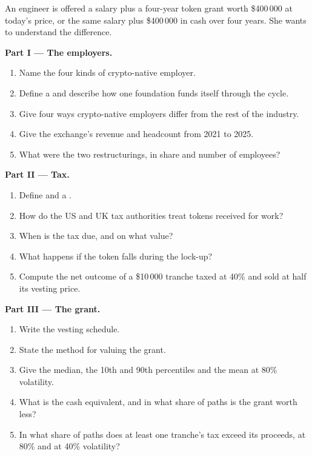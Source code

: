 \begin{problem}\label{pb:in:crypto-native-firms:1}
An engineer is offered a salary plus a four-year token grant worth \$400\,000 at today's price, or the same salary plus
\$400\,000 in cash over four years. She wants to understand the difference.

\medskip\noindent\textbf{Part I --- The employers.}
\begin{enumerate}
\item Name the four kinds of crypto-native employer.
\item Define a  and describe how one foundation funds itself through the cycle.
\item Give four ways crypto-native employers differ from the rest of the industry.
\item Give the exchange's revenue and headcount from 2021 to 2025.
\item What were the two restructurings, in share and number of employees?
\end{enumerate}

\medskip\noindent\textbf{Part II --- Tax.}
\begin{enumerate}[resume]
\item Define  and a .
\item How do the US and UK tax authorities treat tokens received for work?
\item When is the tax due, and on what value?
\item What happens if the token falls during the lock-up?
\item Compute the net outcome of a \$10\,000 tranche taxed at 40\% and sold at half its vesting price.
\end{enumerate}

\medskip\noindent\textbf{Part III --- The grant.}
\begin{enumerate}[resume]
\item Write the vesting schedule.
\item State the method for valuing the grant.
\item Give the median, the 10th and 90th percentiles and the mean at 80\% volatility.
\item What is the cash equivalent, and in what share of paths is the grant worth less?
\item In what share of paths does at least one tranche's tax exceed its proceeds, at 80\% and at 40\% volatility?
\end{enumerate}


\end{problem}
